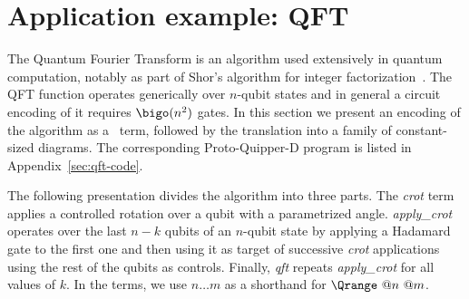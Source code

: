 \section{Application example: QFT}%
\label{sec:qft-example}%

The Quantum Fourier Transform is an algorithm used extensively in quantum computation,
notably as part of Shor's algorithm for integer factorization~\cite{nielsen_chuang_quantum_programming}.
The QFT function operates generically over $n$-qubit states and in general a circuit encoding of it
requires $\bigo(n^2)$ gates.
In this section we present an encoding of the algorithm as a \lambdaD\ term,
followed by the translation into a family of constant-sized diagrams.
The corresponding Proto-Quipper-D program is listed in Appendix~\ref{sec:qft-code}.

The following presentation divides the algorithm into three parts.
The \textit{crot} term applies a controlled rotation over a qubit with a parametrized angle.
\textit{apply\_crot} operates over the last $n-k$ qubits of an $n$-qubit state
by applying a Hadamard gate to the first one and then using it as target
of successive \textit{crot} applications using the rest of the qubits as controls.
Finally, \textit{qft} repeats \textit{apply\_crot} for all values of $k$.
In the terms, we use $n\dots m$ as a shorthand for $\Qrange\ @n\ @m$.
\\

